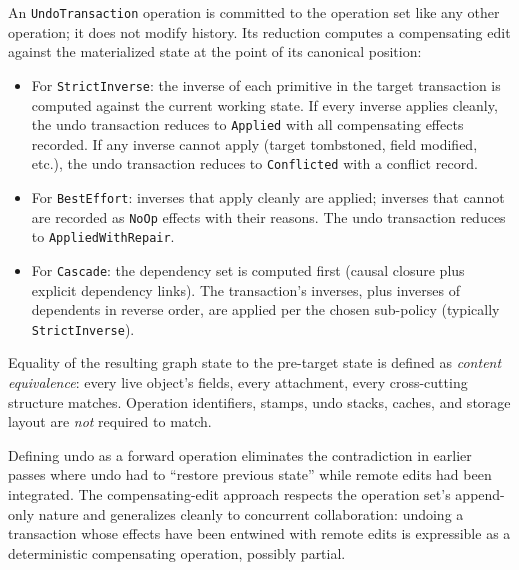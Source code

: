 \documentclass[11pt,letterpaper]{report}
\newcounter{requirement}[chapter]
\begin{document}
\begin{requirement}
  \label{req:semops:compensating-undo}
  An \texttt{UndoTransaction} operation is committed to the operation
  set like any other operation; it does not modify history. Its
  reduction computes a compensating edit against the materialized
  state at the point of its canonical position:

  \begin{itemize}
    \item For \texttt{StrictInverse}: the inverse of each primitive
      in the target transaction is computed against the current
      working state. If every inverse applies cleanly, the undo
      transaction reduces to \texttt{Applied} with all compensating
      effects recorded. If any inverse cannot apply (target
      tombstoned, field modified, etc.), the undo transaction
      reduces to \texttt{Conflicted} with a conflict record.
    \item For \texttt{BestEffort}: inverses that apply cleanly are
      applied; inverses that cannot are recorded as \texttt{NoOp}
      effects with their reasons. The undo transaction reduces to
      \texttt{AppliedWithRepair}.
    \item For \texttt{Cascade}: the dependency set is computed first
      (causal closure plus explicit dependency links). The
      transaction's inverses, plus inverses of dependents in
      reverse order, are applied per the chosen sub-policy
      (typically \texttt{StrictInverse}).
  \end{itemize}

  Equality of the resulting graph state to the pre-target state is
  defined as \emph{content equivalence}: every live object's fields,
  every attachment, every cross-cutting structure matches. Operation
  identifiers, stamps, undo stacks, caches, and storage layout are
  \emph{not} required to match.
\end{requirement}

\begin{rationale}
  Defining undo as a forward operation eliminates the contradiction
  in earlier passes where undo had to ``restore previous state''
  while remote edits had been integrated. The compensating-edit
  approach respects the operation set's append-only nature and
  generalizes cleanly to concurrent collaboration: undoing a
  transaction whose effects have been entwined with remote edits is
  expressible as a deterministic compensating operation, possibly
  partial.
\end{rationale}
\end{document}
